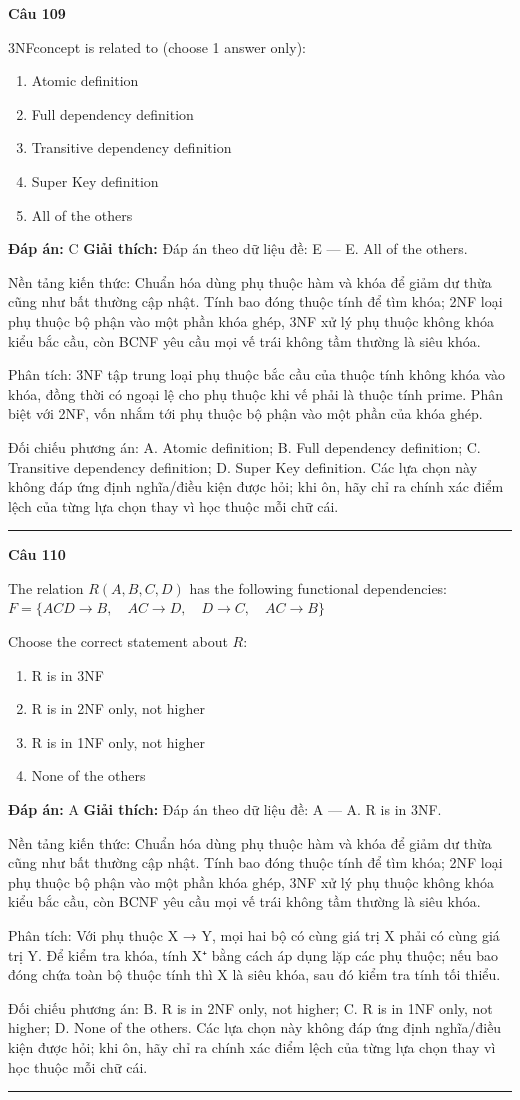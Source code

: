 \documentclass[11pt,a4paper]{article}
\newenvironment{question}[1]{%
  \par\vspace{1em}\noindent\textbf{\large Câu #1}\par\vspace{0.4em}
}{%
  \par\vspace{1em}\hrule\vspace{0.6em}
}
\newenvironment{choices}{%
  \begin{enumerate}[label=\textbf{\Alph*.},leftmargin=2.2em,itemsep=2pt,topsep=3pt]
}{%
  \end{enumerate}
}
\newcommand{\choice}{\item}
\begin{document}
\begin{question}{109}
3NFconcept is related to (choose 1 answer only):
\begin{choices}
\choice Atomic definition
\choice Full dependency definition
\choice Transitive dependency definition
\choice Super Key definition
\choice All of the others
\end{choices}
\textbf{Đáp án:} C
\textbf{Giải thích:} Đáp án theo dữ liệu đề: E — E. All of the others.

Nền tảng kiến thức: Chuẩn hóa dùng phụ thuộc hàm và khóa để giảm dư thừa cũng như bất thường cập nhật. Tính bao đóng thuộc tính để tìm khóa; 2NF loại phụ thuộc bộ phận vào một phần khóa ghép, 3NF xử lý phụ thuộc không khóa kiểu bắc cầu, còn BCNF yêu cầu mọi vế trái không tầm thường là siêu khóa.

Phân tích: 3NF tập trung loại phụ thuộc bắc cầu của thuộc tính không khóa vào khóa, đồng thời có ngoại lệ cho phụ thuộc khi vế phải là thuộc tính prime. Phân biệt với 2NF, vốn nhắm tới phụ thuộc bộ phận vào một phần của khóa ghép.

Đối chiếu phương án: A. Atomic definition; B. Full dependency definition; C. Transitive dependency definition; D. Super Key definition. Các lựa chọn này không đáp ứng định nghĩa/điều kiện được hỏi; khi ôn, hãy chỉ ra chính xác điểm lệch của từng lựa chọn thay vì học thuộc mỗi chữ cái.
\end{question}

\begin{question}{110}
The relation \(R(A, B, C, D)\) has the following functional dependencies:
\(F = \{ ACD \rightarrow B, \quad AC \rightarrow D, \quad D \rightarrow C, \quad AC \rightarrow B \}\)

Choose the correct statement about \(R\):
\begin{choices}
\choice R is in 3NF
\choice R is in 2NF only, not higher
\choice R is in 1NF only, not higher
\choice None of the others
\end{choices}
\textbf{Đáp án:} A
\textbf{Giải thích:} Đáp án theo dữ liệu đề: A — A. R is in 3NF.

Nền tảng kiến thức: Chuẩn hóa dùng phụ thuộc hàm và khóa để giảm dư thừa cũng như bất thường cập nhật. Tính bao đóng thuộc tính để tìm khóa; 2NF loại phụ thuộc bộ phận vào một phần khóa ghép, 3NF xử lý phụ thuộc không khóa kiểu bắc cầu, còn BCNF yêu cầu mọi vế trái không tầm thường là siêu khóa.

Phân tích: Với phụ thuộc X → Y, mọi hai bộ có cùng giá trị X phải có cùng giá trị Y. Để kiểm tra khóa, tính X⁺ bằng cách áp dụng lặp các phụ thuộc; nếu bao đóng chứa toàn bộ thuộc tính thì X là siêu khóa, sau đó kiểm tra tính tối thiểu.

Đối chiếu phương án: B. R is in 2NF only, not higher; C. R is in 1NF only, not higher; D. None of the others. Các lựa chọn này không đáp ứng định nghĩa/điều kiện được hỏi; khi ôn, hãy chỉ ra chính xác điểm lệch của từng lựa chọn thay vì học thuộc mỗi chữ cái.
\end{question}
\end{document}
